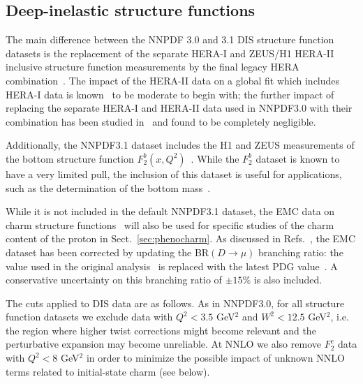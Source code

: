 


\clearpage

\subsection{Deep-inelastic structure functions}
\label{sec:datadis}

The main difference between the NNPDF 3.0 and 3.1 DIS structure function 
datasets is the replacement of the separate HERA-I and ZEUS/H1 HERA-II inclusive 
structure function measurements by the final
legacy HERA combination~\cite{Abramowicz:2015mha}. The impact of the HERA-II data on a global fit which includes HERA-I
data is
known~\cite{Ball:2014uwa,Thorne:2015caa,Hou:2016nqm,Harland-Lang:2016yfn} to be moderate to
begin with; the further impact of replacing the separate HERA-I and
HERA-II data used in NNPDF3.0 with their combination has been studied
in~\cite{Rojo:2015nxa} and found to be completely negligible.

%
Additionally, the NNPDF3.1 dataset includes the H1 and ZEUS measurements of
the bottom structure function
$F_2^b(x,Q^2)$~\cite{Aaron:2009af,Abramowicz:2014zub}.
%
While the $F_2^b$ dataset is known to have a very limited pull,
the inclusion of this dataset is useful for applications, such as the determination of
the bottom mass~\cite{Harland-Lang:2015qea}.

While it is not included in the default NNPDF3.1 dataset, the EMC data on charm
structure functions~\cite{Aubert:1982tt} will also be used for specific
studies of the charm content of the proton in Sect.~\ref{sec:phenocharm}.
%
As discussed in Refs.~\cite{Ball:2016neh,Rottoli:2016lsg}, the EMC
dataset has been corrected by updating the BR$(D\to \mu)$ branching  
ratio: the value used in the original analysis~\cite{Aubert:1982tt} 
is replaced with the latest PDG value~\cite{Olive:2016xmw}. A conservative
uncertainty on this branching ratio of $\pm 15\%$ is also included.


The cuts applied to DIS data are as follows. As in NNPDF3.0, for
all structure function datasets we exclude
data with $Q^2 < 3.5$ GeV$^2$
and $W^2< 12.5$ GeV$^2$, i.e.
the region where higher twist corrections
might become relevant and the perturbative expansion may become
unreliable. 
At NNLO we also remove $F_2^c$ data with 
$Q^2 < 8$ GeV$^2$ in order to minimize the possible impact of unknown
NNLO terms related to initial-state charm (see below).


